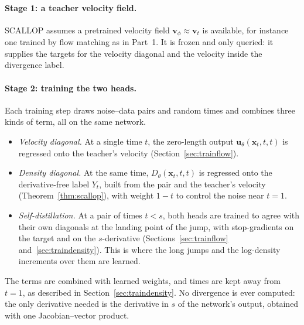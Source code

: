 \documentclass[11pt,a4paper]{article}
\numberwithin{equation}{section}     %
\theoremstyle{plain}        %
\theoremstyle{definition}   %
\theoremstyle{remark}       %
\begin{document}
\paragraph{Stage 1: a teacher velocity field.} SCALLOP assumes a pretrained velocity field $\mathbf{v}_\phi\approx\mathbf{v}_t$ is available, for instance one trained by flow matching as in Part~1. It is frozen and only queried: it supplies the targets for the velocity diagonal and the velocity inside the divergence label.

\paragraph{Stage 2: training the two heads.} Each training step draws noise--data pairs and random times and combines three kinds of term, all on the same network.
\begin{itemize}
\item \emph{Velocity diagonal.} At a single time $t$, the zero-length output $\mathbf{u}_\theta(\mathbf{x}_t,t,t)$ is regressed onto the teacher's velocity (Section~\ref{sec:trainflow}).
\item \emph{Density diagonal.} At the same time, $D_\theta(\mathbf{x}_t,t,t)$ is regressed onto the derivative-free label $Y_t$, built from the pair and the teacher's velocity (Theorem~\ref{thm:scallop}), with weight $1-t$ to control the noise near $t=1$.
\item \emph{Self-distillation.} At a pair of times $t<s$, both heads are trained to agree with their own diagonals at the landing point of the jump, with stop-gradients on the target and on the $s$-derivative (Sections~\ref{sec:trainflow} and~\ref{sec:traindensity}). This is where the long jumps and the log-density increments over them are learned.
\end{itemize}
The terms are combined with learned weights, and times are kept away from $t=1$, as described in Section~\ref{sec:traindensity}. No divergence is ever computed: the only derivative needed is the derivative in $s$ of the network's output, obtained with one Jacobian--vector product.
\end{document}

